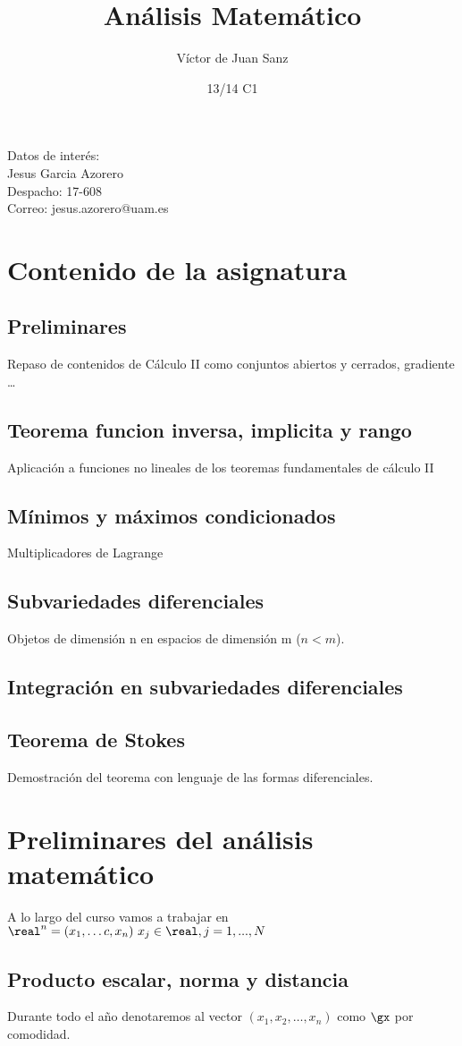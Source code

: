 \documentclass{apuntes}
\title{Análisis Matemático}
\author{Víctor de Juan Sanz}
\date{13/14 C1}
\begin{document}
\maketitle
\newpage
\tableofcontents
\newpage
Datos de interés:\\
Jesus Garcia Azorero\\
Despacho: 17-608\\
Correo: jesus.azorero@uam.es


\section{Contenido de la asignatura}
\subsection{Preliminares}
Repaso de contenidos de Cálculo II como conjuntos abiertos y cerrados, gradiente \dots
\subsection{Teorema funcion inversa, implicita y rango}
Aplicación a funciones no lineales de los teoremas fundamentales de cálculo II
\subsection{Mínimos y máximos condicionados}
Multiplicadores de Lagrange
\subsection{Subvariedades diferenciales}
Objetos de dimensión n en espacios de dimensión m ($n<m$).
\subsection{Integración en subvariedades diferenciales}
\subsection{Teorema de Stokes}
Demostración del teorema con lenguaje de las formas diferenciales.
\newpage


\section{Preliminares del análisis matemático}
A lo largo del curso vamos a trabajar en $\real^n={(x_1,\dots c, x_n) \  x_j \in \real, j=1,...,N}$
\subsection{Producto escalar, norma y distancia}
Durante todo el año denotaremos al vector $(x_1,x_2,\dots,x_n)$ como $\gx$ por comodidad.
\end{document}
